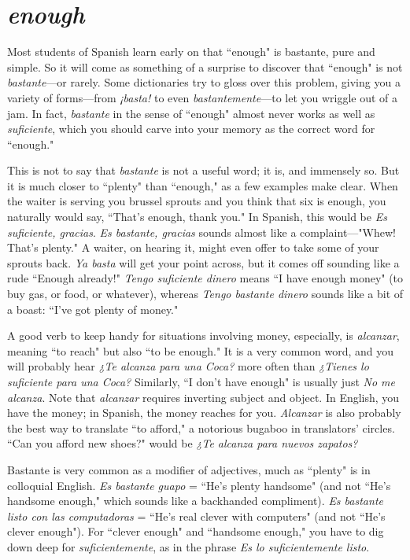 \section{\emph{enough}}

Most students of Spanish learn early on that ``enough" is bastante, pure and simple. So it will come as something of a surprise to
discover that ``enough" is not \emph{bastante}---or rarely. Some dictionaries
try to gloss over this problem, giving you a variety of forms---from
\emph{¡basta!} to even \emph{bastantemente}---to let you wriggle out of a jam. In
fact, \emph{bastante} in the sense of ``enough" almost never works as well as
\emph{suficiente}, which you should carve into your memory as the correct
word for ``enough."

This is not to say that \emph{bastante} is not a useful word; it is,
and immensely so. But it is much closer to ``plenty" than ``enough,"
as a few examples make clear. When the waiter is serving you brussel sprouts and you think that six is enough, you naturally would say,
``That's enough, thank you." In Spanish, this would be \emph{Es suficiente,
gracias}. \emph{Es bastante, gracias} sounds almost like a complaint---"Whew!
That's plenty." A waiter, on hearing it, might even offer to take some
of your sprouts back. \emph{Ya basta} will get your point across, but it comes
off sounding like a rude ``Enough already!" \emph{Tengo suficiente dinero}
means ``I have enough money" (to buy gas, or food, or whatever),
whereas \emph{Tengo bastante dinero} sounds like a bit of a boast: ``I've got
plenty of money."

A good verb to keep handy for situations involving money, especially, is \emph{alcanzar}, meaning ``to reach" but also ``to be enough." It is
a very common word, and you will probably hear \emph{¿Te alcanza para una
Coca?} more often than \emph{¿Tienes lo suficiente para una Coca?} Similarly,
``I don't have enough" is usually just \emph{No me alcanza}. Note that
\emph{alcanzar} requires inverting subject and object. In English, you have the
money; in Spanish, the money reaches for you. \emph{Alcanzar} is also probably the best way to translate ``to afford," a notorious bugaboo in translators' circles. ``Can you afford new shoes?" would be \emph{¿Te alcanza para
nuevos zapatos?}

Bastante is very common as a modifier of adjectives, much as
``plenty" is in colloquial English. \emph{Es bastante guapo} = ``He's plenty
handsome" (and not ``He's handsome enough," which sounds like a
backhanded compliment). \emph{Es bastante listo con las computadoras} =
``He's real clever with computers" (and not ``He's clever enough"). For
``clever enough" and ``handsome enough," you have to dig down deep
for \emph{suficientemente}, as in the phrase \emph{Es lo suficientemente listo}.

